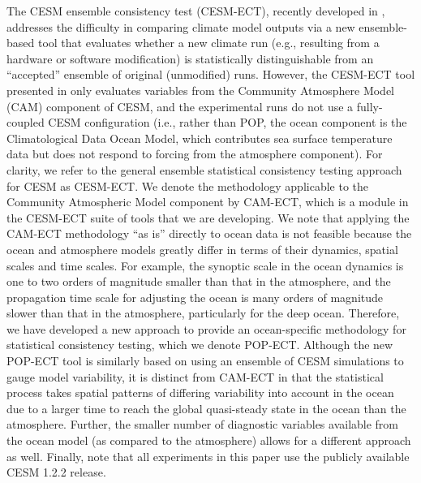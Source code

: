 \documentclass[gmd, manuscript]{copernicus}
\begin{document}
The CESM ensemble consistency test (CESM-ECT), recently developed in \cite{baker2015}, addresses the difficulty in comparing climate model outputs via a new ensemble-based tool that evaluates whether a new climate run (e.g., resulting from a hardware or software modification) is statistically distinguishable from an ``accepted'' ensemble of original (unmodified) runs.  However, the CESM-ECT tool presented in \cite{baker2015} only evaluates variables from the Community Atmosphere Model (CAM) component of CESM, and the experimental runs do not use a fully-coupled CESM configuration (i.e., rather than POP, the ocean component is the Climatological Data Ocean Model, which contributes sea surface temperature data but does not respond to forcing from the atmosphere component). For clarity, we refer to the general ensemble statistical consistency testing approach for CESM as CESM-ECT.  We denote the methodology applicable to the Community Atmospheric Model component by CAM-ECT, which is a module in the CESM-ECT suite of tools that we are developing.  We note that applying the CAM-ECT methodology ``as is'' directly to ocean data is not feasible because the ocean and atmosphere models greatly differ in terms of their dynamics, spatial scales and time scales.  For example, the synoptic scale in the ocean dynamics is one to two orders of magnitude smaller than that in the atmosphere, and the propagation time scale for adjusting the ocean is many orders of magnitude slower than that in the atmosphere, particularly for the deep ocean.  Therefore, we have developed a new approach to provide an ocean-specific methodology for statistical consistency testing, which we denote POP-ECT.  Although the new POP-ECT tool is similarly based on using an ensemble of CESM simulations to gauge model variability, it is distinct from CAM-ECT in that the statistical process takes spatial patterns of differing variability into account in the ocean due to a larger time to reach the global quasi-steady state in the ocean than the atmosphere.  Further, the smaller number of diagnostic variables available from the ocean model (as compared to the atmosphere) allows for a different approach as well.  Finally, note that all experiments in this paper use the publicly available CESM 1.2.2 release.

\end{document}
